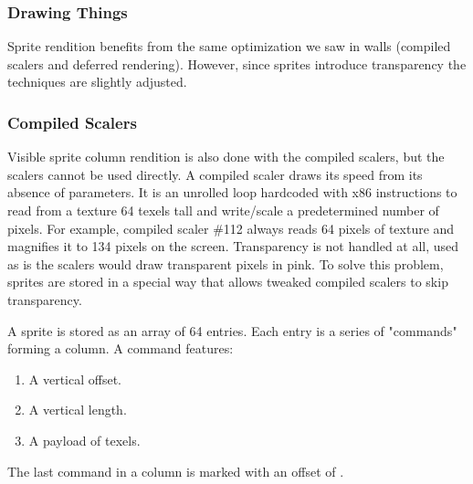\subsubsection{Drawing Things}
Sprite rendition benefits from the same optimization we saw in walls (compiled scalers and deferred rendering). However, since sprites introduce transparency the techniques are slightly adjusted.

\subsubsection{Compiled Scalers}
Visible sprite column rendition is also done with the compiled scalers, but the scalers cannot be used directly. A compiled scaler draws its speed from its absence of parameters. It is an unrolled loop hardcoded with x86 instructions to read from a texture 64 texels tall and write/scale a predetermined number of pixels. For example, compiled scaler \#112 always reads 64 pixels of texture and magnifies it to 134 pixels on the screen. Transparency is not handled at all, used as is the scalers would draw transparent pixels in pink. To solve this problem, sprites are stored in a special way that allows tweaked compiled scalers to skip transparency.\\
\par
A sprite is stored as an array of 64 entries. Each entry is a series of "commands" forming a column. A command features:
\begin{enumerate}
 \item A vertical offset.
 \item A vertical length.
 \item A payload of texels.
 \end{enumerate}
\par
The last command in a column is marked with an offset of .\\
\par

